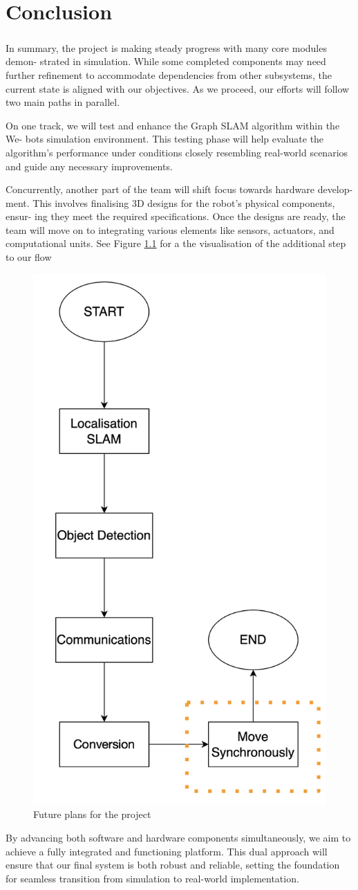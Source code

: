 \chapter{Conclusion}

\paragraph*{}
In summary, the project is making steady progress with many core modules demon-
strated in simulation. While some completed components may need further refinement
to accommodate dependencies from other subsystems, the current state is aligned with
our objectives. As we proceed, our efforts will follow two main paths in parallel.

On one track, we will test and enhance the Graph SLAM algorithm within the We-
bots simulation environment. This testing phase will help evaluate the algorithm’s
performance under conditions closely resembling real-world scenarios and guide any
necessary improvements.

Concurrently, another part of the team will shift focus towards hardware develop-
ment. This involves finalising 3D designs for the robot’s physical components, ensur-
ing they meet the required specifications. Once the designs are ready, the team will
move on to integrating various elements like sensors, actuators, and computational
units. See Figure \ref{fig:future-plans} for a the visualisation of the additional step to our flow

\begin{figure} [H]
    \centering
    \includegraphics[width=0.5\linewidth]{assets/images/conclusion/future-plans.png}
    \caption{Future plans for the project}
    \label{fig:future-plans}
\end{figure}

By advancing both software and hardware components simultaneously, we aim to
achieve a fully integrated and functioning platform. This dual approach will ensure
that our final system is both robust and reliable, setting the foundation for seamless
transition from simulation to real-world implementation.
